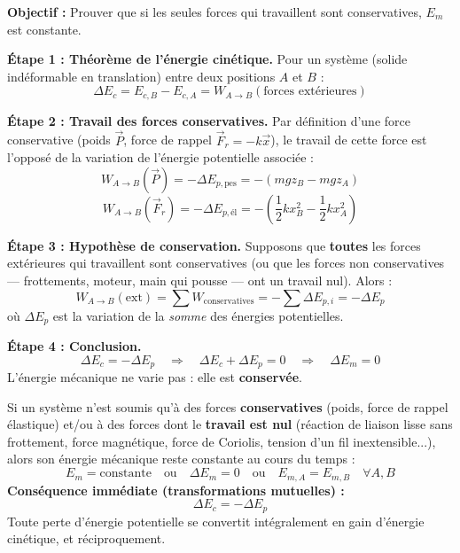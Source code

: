 \documentclass[11pt]{article}
\begin{document}
\begin{experience}
\textbf{Objectif :} Prouver que si les seules forces qui travaillent sont conservatives, $E_m$ est constante.

\textbf{Étape 1 : Théorème de l'énergie cinétique.} Pour un système (solide indéformable en translation) entre deux positions $A$ et $B$ :
\[
\Delta E_c = E_{c,B} - E_{c,A} = W_{A\to B}(\text{forces extérieures})
\]

\textbf{Étape 2 : Travail des forces conservatives.} Par définition d'une force conservative (poids $\vec{P}$, force de rappel $\vec{F}_r = -k\vec{x}$), le travail de cette force est l'opposé de la variation de l'énergie potentielle associée :
\[
W_{A\to B}(\vec{P}) = -\Delta E_{p,\text{pes}} = -(mgz_B - mgz_A)
\]
\[
W_{A\to B}(\vec{F}_r) = -\Delta E_{p,\text{él}} = -\left(\frac{1}{2}kx_B^2 - \frac{1}{2}kx_A^2\right)
\]

\textbf{Étape 3 : Hypothèse de conservation.} Supposons que \textbf{toutes} les forces extérieures qui travaillent sont conservatives (ou que les forces non conservatives — frottements, moteur, main qui pousse — ont un travail nul). Alors :
\[
W_{A\to B}(\text{ext}) = \sum W_{\text{conservatives}} = -\sum \Delta E_{p,i} = -\Delta E_p
\]
où $\Delta E_p$ est la variation de la \emph{somme} des énergies potentielles.

\textbf{Étape 4 : Conclusion.}
\[
\Delta E_c = -\Delta E_p \quad \Longrightarrow \quad \Delta E_c + \Delta E_p = 0 \quad \Longrightarrow \quad \Delta E_m = 0
\]
L'énergie mécanique ne varie pas : elle est \textbf{conservée}.
\end{experience}

\begin{propriete}
Si un système n'est soumis qu'à des forces \textbf{conservatives} (poids, force de rappel élastique) et/ou à des forces dont le \textbf{travail est nul} (réaction de liaison lisse sans frottement, force magnétique, force de Coriolis, tension d'un fil inextensible...), alors son énergie mécanique reste constante au cours du temps :
\[
E_m = \text{constante} \quad \text{ou} \quad \Delta E_m = 0 \quad \text{ou} \quad E_{m,A} = E_{m,B} \quad \forall A,B
\]
\textbf{Conséquence immédiate (transformations mutuelles) :}
\[
\Delta E_c = -\Delta E_p
\]
Toute perte d'énergie potentielle se convertit intégralement en gain d'énergie cinétique, et réciproquement.
\end{propriete}
\end{document}
